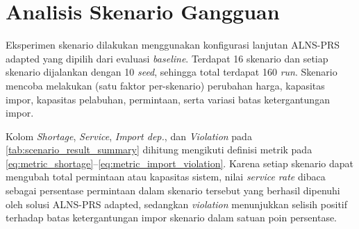 \documentclass{file/TA-ITS}
\theoremstyle{definition}
\theoremstyle{definition}
\theoremstyle{plain}
\begin{document}
\section{Analisis Skenario Gangguan}
Eksperimen skenario dilakukan menggunakan konfigurasi lanjutan ALNS-PRS adapted yang dipilih dari evaluasi \textit{baseline}. Terdapat 16 skenario dan setiap skenario dijalankan dengan 10 \textit{seed}, sehingga total terdapat 160 \textit{run}. Skenario mencoba melakukan (satu faktor per-skenario) perubahan harga, kapasitas impor, kapasitas pelabuhan, permintaan, serta variasi batas ketergantungan impor.


Kolom \textit{Shortage}, \textit{Service}, \textit{Import dep.}, dan \textit{Violation} pada \ref{tab:scenario_result_summary} dihitung mengikuti definisi metrik pada \ref{eq:metric_shortage}--\ref{eq:metric_import_violation}. Karena setiap skenario dapat mengubah total permintaan atau kapasitas sistem, nilai \textit{service rate} dibaca sebagai persentase permintaan dalam skenario tersebut yang berhasil dipenuhi oleh solusi ALNS-PRS adapted, sedangkan \textit{violation} menunjukkan selisih positif terhadap batas ketergantungan impor skenario dalam satuan poin persentase.
\end{document}
